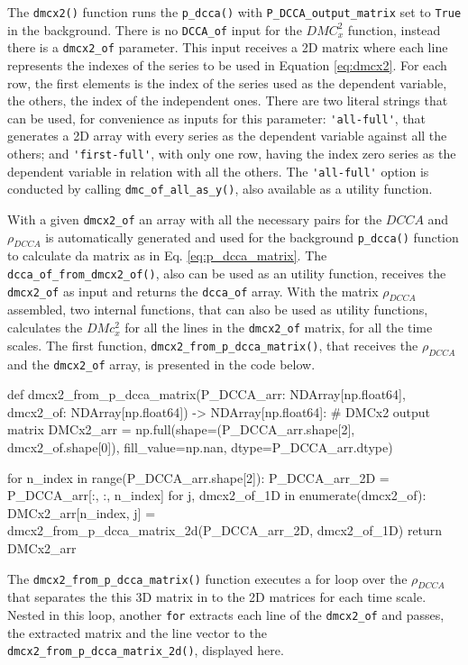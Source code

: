 \documentclass[article]{jss}
\begin{document}
The \verb"dmcx2()" function runs the \verb"p_dcca()" with \verb"P_DCCA_output_matrix" set to \verb"True" in the background. There is no \verb"DCCA_of" input for the $DMC_x^2$ function, instead there is a \verb"dmcx2_of" parameter. This input receives a 2D matrix where each line represents the indexes of the series to be used in Equation \ref{eq:dmcx2}. For each row, the first elements is the index of the series used as the dependent variable, the others, the index of the independent ones. There are two literal strings that can be used, for convenience as inputs for this parameter: \verb"'all-full'", that generates a 2D array with every series as the dependent variable against all the others; and \verb"'first-full'", with only one row, having the index zero series as the dependent variable in relation with all the others. The \verb"'all-full'" option is conducted by calling \verb"dmc_of_all_as_y()", also available as a utility function.

With a given \verb"dmcx2_of" an array with all the necessary pairs for the $DCCA$ and $\rho_{DCCA}$ is automatically generated and used for the background \verb"p_dcca()" function to calculate da matrix as in Eq. \ref{eq:p_dcca_matrix}. The \verb"dcca_of_from_dmcx2_of()", also can be used as an utility function, receives the  \verb"dmcx2_of" as input and returns the \verb"dcca_of" array. With the matrix $\rho_{DCCA}$ assembled, two internal functions, that can also be used as utility functions, calculates the $DMc_{x}^2$ for all the lines in the \verb"dmcx2_of" matrix, for all the time scales. The first function, \verb"dmcx2_from_p_dcca_matrix()", that receives the $\rho_{DCCA}$ and the \verb"dmcx2_of" array, is presented in the code below.

\begin{Code}
def dmcx2_from_p_dcca_matrix(P_DCCA_arr: NDArray[np.float64], 
      dmcx2_of: NDArray[np.float64]) -> NDArray[np.float64]:   
    # DMCx2 output matrix
    DMCx2_arr = np.full(shape=(P_DCCA_arr.shape[2], dmcx2_of.shape[0]),
    fill_value=np.nan, dtype=P_DCCA_arr.dtype)

    for n_index in range(P_DCCA_arr.shape[2]):
        P_DCCA_arr_2D = P_DCCA_arr[:, :, n_index]
        for j,  dmcx2_of_1D in enumerate(dmcx2_of):
            DMCx2_arr[n_index, j] = dmcx2_from_p_dcca_matrix_2d(P_DCCA_arr_2D,
                                                                dmcx2_of_1D)
    return DMCx2_arr
\end{Code}

The \verb"dmcx2_from_p_dcca_matrix()" function executes a for loop over the $\rho_{DCCA}$ that separates the this 3D matrix in to the 2D matrices for each time scale. Nested in this loop, another \verb"for" extracts each line of the \verb"dmcx2_of" and passes, the extracted matrix and the line vector to the \verb"dmcx2_from_p_dcca_matrix_2d()", displayed here.
\end{document}
